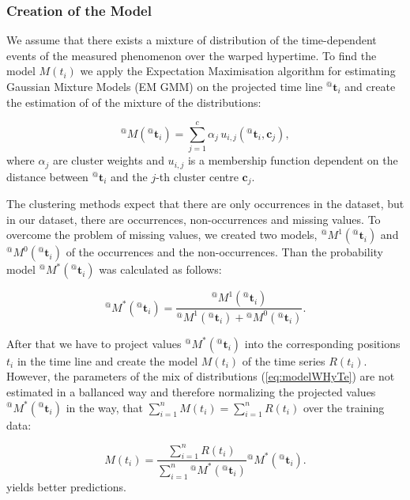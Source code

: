 \subsubsection{Creation of the Model}\label{sec:modelWhyte}

We assume that there exists a mixture of distribution of the time-dependent events of the measured phenomenon over the warped hypertime.
To find the model $M(t_{i})$ we apply the Expectation Maximisation algorithm for estimating Gaussian Mixture Models (EM GMM) on the projected time line ${}^{@}\mathbf{t}_{i}$ and create the estimation of of the mixture of the distributions:

\begin{equation}\label{eq:modelWHyTe}
{}^{@}M({}^{@}\mathbf{t}_{i}) =  \sum_{j=1}^{c}{\alpha_j\,u_{i,j}\left({}^{@}\mathbf{t}_{i}, \mathbf{c}_{j}\right)},
\end{equation}
%
\noindent where $\alpha_{j}$ are cluster weights and $u_{i,j}$ is a membership function dependent on the distance between ${}^{@}\mathbf{t}_{i}$ and the $j$-th cluster centre $\mathbf{c}_{j}$.

The clustering methods expect that there are only occurrences in the dataset, but in our dataset, there are occurrences, non-occurrences and missing values.
To overcome the problem of missing values, we created two models, ${}^{@}M^{1}({}^{@}\mathbf{t}_{i})$ and ${}^{@}M^{0}({}^{@}\mathbf{t}_{i})$ of the occurrences and the non-occurrences.
Than the probability model ${}^{@}M^{*}({}^{@}\mathbf{t}_{i})$ was calculated as follows:

\begin{equation}\label{eq:probabilityWHyTe}
{}^{@}M^{*}({}^{@}\mathbf{t}_{i}) = \frac{{}^{@}M^{1}({}^{@}\mathbf{t}_{i})}{{}^{@}M^{1}({}^{@}\mathbf{t}_{i}) + {}^{@}M^{0}({}^{@}\mathbf{t}_{i})}.
\end{equation}

After that we have to project values ${}^{@}M^{*}({}^{@}\mathbf{t}_{i})$ into the corresponding positions $t_{i}$ in the time line and create the model $M(t_{i})$ of the time series $R(t_{i})$.
However, the parameters of the mix of distributions (\ref{eq:modelWHyTe}) are not estimated in a ballanced way and therefore 
normalizing the projected values ${}^{@}M^{*}({}^{@}\mathbf{t}_{i})$ in the way, that $\sum^{n}_{i=1}{M(t_{i})} = \sum^{n}_{i=1}{R(t_{i})}$ over the training data:

\begin{equation}\label{eq:modelNormalisation}
M(t_{i}) = \frac{\sum^{n}_{i=1}{R(t_{i})}}{ \sum^{n}_{i=1}{{}^{@}M^{*}({}^{@}\mathbf{t}_{i})}}{}^{@}M^{*}({}^{@}\mathbf{t}_{i}).
\end{equation}
%
yields better predictions.







